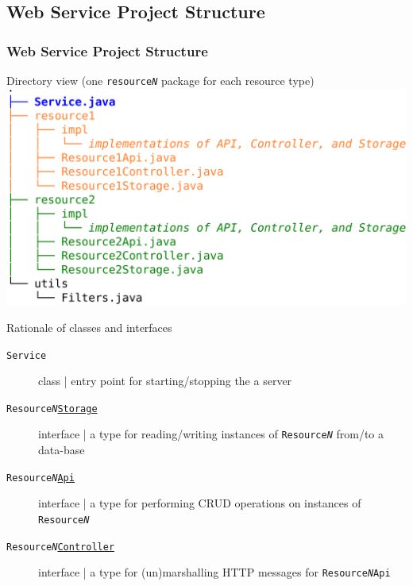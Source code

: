 \documentclass[presentation]{beamer}\mode<presentation>{\usetheme{AMSBolognaFC}}
\begin{document}
\subsection{Web Service Project Structure}

\begin{frame}[allowframebreaks]\frametitle{Web Service Project Structure}
    \begin{block}{Directory view (one \texttt{resource\textit{N}} package for each resource type)}\centering
        \includegraphics[width=.8\linewidth]{./img/ws-structure.pdf}
    \end{block}

    \begin{block}{Rationale of classes and interfaces}
        \begin{description}
            \item[\texttt{Service}] class | entry point for starting/stopping the a server
            \item[\texttt{Resource\textit{N}\underline{Storage}}] interface | a type for reading/writing instances of \texttt{Resource\textit{N}} from/to a data-base
            \item[\texttt{Resource\textit{N}\underline{Api}}] interface | a type for performing CRUD operations on instances of \texttt{Resource\textit{N}}
            \item[\texttt{Resource\textit{N}\underline{Controller}}] interface | a type for (un)marshalling HTTP messages for \texttt{Resource\textit{N}Api}
        \end{description}
    \end{block}


\end{frame}
\end{document}
